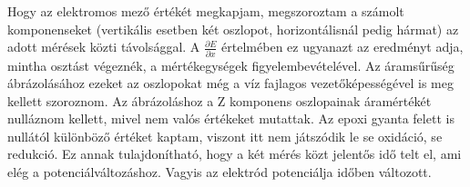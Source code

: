 Hogy az elektromos mező értékét megkapjam, megszoroztam a számolt komponenseket (vertikális esetben két oszlopot, horizontálisnál pedig hármat) az adott mérések közti távolsággal. A $\frac{\partial E}{\partial x}$ értelmében ez ugyanazt az eredményt adja, mintha osztást végeznék, a mértékegységek figyelembevételével. Az áramsűrűség ábrázolásához ezeket az oszlopokat még a víz fajlagos vezetőképességével is meg kellett szoroznom. Az ábrázoláshoz a Z komponens oszlopainak áramértékét nulláznom kellett, mivel nem valós értékeket mutattak. Az epoxi gyanta felett is nullától különböző értéket kaptam, viszont itt nem játszódik le se oxidáció, se redukció. Ez annak tulajdonítható, hogy a két mérés közt jelentős idő telt el, ami elég a potenciálváltozáshoz. Vagyis az elektród potenciálja időben változott.
